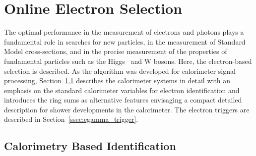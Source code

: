 \section{Online Electron Selection}\label{sec:context}


The optimal performance in the measurement of electrons and photons plays a fundamental role in searches for new particles, in the measurement of Standard Model cross-sections, and in the precise measurement of the properties of fundamental particles such as the Higgs~\cite{HIGG-2012-27,HIGG-2016-33} and W bosons. Here, the electron-based selection is described. As the \rnn{} algorithm was developed for calorimeter signal processing, Section~\ref{sec:atlas_trigger} describes the calorimeter systems in detail with an emphasis on the standard calorimeter variables for electron identification and introduces the ring sums as alternative features envisaging a compact detailed description for shower developments in the calorimeter. The electron triggers are described in Section~\ref{ssec:egamma_trigger}.



\subsection{Calorimetry Based Identification}\label{sec:atlas_trigger}

